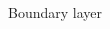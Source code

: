 \documentclass[18pt,xcolor=table]{beamer}
\begin{document}
\begin{frame}[t]
\begin{columns}[c]
\begin{column}{.4\textwidth}
\begin{figure}
Boundary layer
\end{figure}
\end{column}
\end{columns}
\end{frame}  


\end{document}
